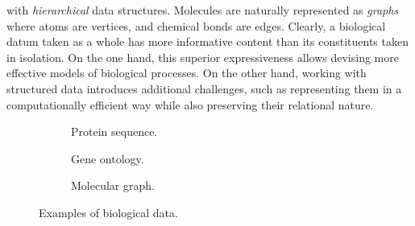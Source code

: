 with \emph{hierarchical} data structures. Molecules are naturally represented as \emph{graphs} where atoms are vertices, and chemical bonds are edges. Clearly, a biological datum taken as a whole has more informative content than its constituents taken in isolation. On the one hand, this superior expressiveness allows devising more effective models of biological processes. On the other hand, working with structured data introduces additional challenges, such as representing them in a computationally efficient way while also preserving their relational nature.

\begin{figure*}[h!]
    \begin{subfigure}[b]{0.32\linewidth}
        \centering
        \resizebox{.9\textwidth}{!}{}
        \caption{Protein sequence.}
        \label{subfig:protein-sequence}
    \end{subfigure}
    \begin{subfigure}[b]{0.36\linewidth}
        \centering
        \resizebox{.9\textwidth}{!}{}
        \caption{Gene ontology.}
        \label{subfig:gene-ontology}
    \end{subfigure}
    \begin{subfigure}[b]{0.28\linewidth}
        \centering
        \resizebox{.7\textwidth}{!}{}
        \caption{Molecular graph.}
        \label{subfig:molecular-graph}
    \end{subfigure}
    \caption{Examples of biological data.}\label{fig:biological-data}
\end{figure*}

